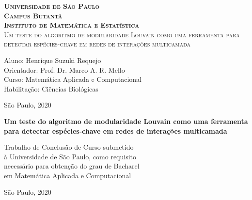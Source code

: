 \thispagestyle{empty}
\begin{center}
    \vspace*{1cm}
    \textbf{\textsc{Universidade de São Paulo\\Campus Butantã\\Instituto de Matemática e Estatística}}\\

    
    \vskip 4cm
    \textsc{\Large{Um teste do algoritmo de modularidade Louvain como uma ferramenta para detectar espécies-chave em redes de interações multicamada}}
    
    \vskip 4cm
    {\large{Aluno: Henrique Suzuki Requejo\\
    Orientador: Prof. Dr. Marco A. R. Mello \\
    Curso: Matemática Aplicada e Computacional\\
    Habilitação: Ciências Biológicas\\}}
    
    \vskip 4cm
    \normalsize{São Paulo, 2020}
\end{center}

\newpage
\thispagestyle{empty}
    \begin{center}
        \vspace*{2.3 cm}
        \textbf{\Large{Um teste do algoritmo de modularidade Louvain como uma ferramenta para detectar espécies-chave em redes de interações multicamada}}\\
        \vspace*{2 cm}
    \end{center}

    \vskip 2cm

    \begin{flushright}
    Trabalho de Conclusão de Curso submetido \\ à Universidade de São Paulo, como requisito \\ necessário para obtenção do grau de Bacharel \\ em Matemática Aplicada e Computacional
    \end{flushright}
 \vskip 6cm
 \begin{center}
    São Paulo, 2020
 \end{center}
\pagebreak